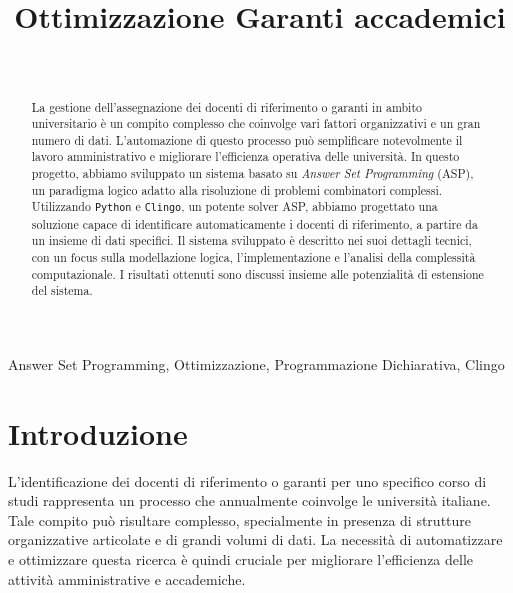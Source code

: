 \documentclass[draft,journal]{IEEEtran}
\begin{document}
\title{Ottimizzazione Garanti accademici}

\author{
\\
\and
{}
}

\maketitle

\begin{abstract} La gestione dell'assegnazione dei docenti di riferimento o
	garanti in ambito universitario è un compito complesso che coinvolge vari
	fattori organizzativi e un gran numero di dati. L'automazione di questo
	processo può semplificare notevolmente il lavoro amministrativo e migliorare
	l'efficienza operativa delle università. In questo progetto, abbiamo
	sviluppato un sistema basato su \textit{Answer Set Programming} (ASP), un
	paradigma logico adatto alla risoluzione di problemi combinatori complessi.
	Utilizzando \texttt{Python} e \texttt{Clingo}, un potente solver ASP, abbiamo
	progettato una soluzione capace di identificare automaticamente i docenti di
	riferimento, a partire da un insieme di dati specifici. Il sistema sviluppato
	è descritto nei suoi dettagli tecnici, con un focus sulla modellazione logica,
	l'implementazione e l'analisi della complessità computazionale. I risultati
	ottenuti sono discussi insieme alle potenzialità di estensione del sistema.
\end{abstract}

\begin{IEEEkeywords}
Answer Set Programming, Ottimizzazione, Programmazione Dichiarativa, Clingo
\end{IEEEkeywords}

\section{Introduzione} L'identificazione dei docenti di riferimento o garanti
per uno specifico corso di studi rappresenta un processo che annualmente
coinvolge le università italiane. Tale compito può risultare complesso,
specialmente in presenza di strutture organizzative articolate e di grandi
volumi di dati. La necessità di automatizzare e ottimizzare questa ricerca è
quindi cruciale per migliorare l'efficienza delle attività amministrative e
accademiche.
\end{document}
